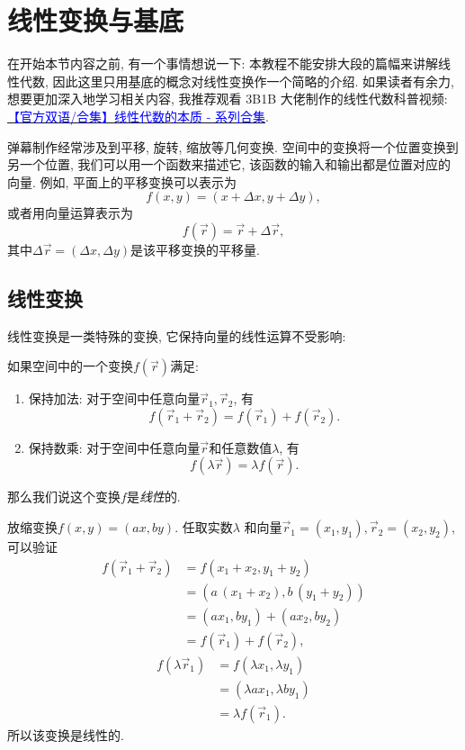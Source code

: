 \section{线性变换与基底} \label{sec:vector-base}

在开始本节内容之前, 有一个事情想说一下:
本教程不能安排大段的篇幅来讲解线性代数,
因此这里只用基底的概念对线性变换作一个简略的介绍.
如果读者有余力, 想要更加深入地学习相关内容,
我推荐观看 3B1B 大佬制作的线性代数科普视频:
\hyperlink{https://www.bilibili.com/video/BV1ys411472E/}
{\textcolor{blue}{【官方双语/合集】线性代数的本质 - 系列合集}}.

弹幕制作经常涉及到平移, 旋转, 缩放等几何变换.
空间中的变换将一个位置变换到另一个位置,
我们可以用一个函数来描述它, 该函数的输入和输出都是位置对应的向量.
例如, 平面上的平移变换可以表示为
\[
  f(x,y) = (x+\Delta{x},y+\Delta{y}),
\]
或者用向量运算表示为
\[
  f(\vec r) = \vec r + \Delta{\vec r},
\]
其中$\Delta{\vec r}=(\Delta{x},\Delta{y})$是该平移变换的平移量.

\subsection{线性变换}

线性变换是一类特殊的变换, 它保持向量的线性运算不受影响:

\begin{definition}[线性变换]
  如果空间中的一个变换$f(\vec r)$满足:
  \begin{enumerate}[label=(\alph*)]
    \item 保持加法: 对于空间中任意向量$\vec r_1,\vec r_2$, 有
          \[
            f(\vec r_1+\vec r_2) = f(\vec r_1) + f(\vec r_2).
          \]
    \item 保持数乘: 对于空间中任意向量$\vec r$和任意数值$\lambda$, 有
          \[
            f(\lambda\vec r) = \lambda f(\vec r).
          \]
  \end{enumerate}
  那么我们说这个变换$f$是\emph{线性}的.
\end{definition}

\begin{example}
  放缩变换$f(x,y) = (ax,by)$. 任取实数$\lambda$
  和向量$\vec r_1=(x_1,y_1),\vec r_2=(x_2,y_2)$, 可以验证
  \begin{align*}
    f(\vec r_1+\vec r_2)
     & = f(x_1+x_2,y_1+y_2)          \\
     & = (a\,(x_1+x_2),b\,(y_1+y_2)) \\
     & = (ax_1,by_1)+(ax_2,by_2)     \\
     & = f(\vec r_1)+f(\vec r_2),
  \end{align*}
  \begin{align*}
    f(\lambda\vec r_1)
     & =f(\lambda x_1,\lambda y_1)  \\
     & =(\lambda ax_1,\lambda by_1) \\
     & =\lambda f(\vec r_1).
  \end{align*}
  所以该变换是线性的.
\end{example}


